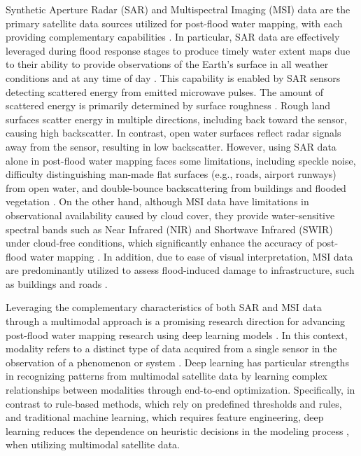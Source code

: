 \documentclass[preprint,12pt,authoryear]{elsarticle}
\begin{document}
Synthetic Aperture Radar (SAR) and Multispectral Imaging (MSI) data are the primary satellite data sources utilized for post-flood water mapping, with each providing complementary capabilities \citep{konapala2021exploring}. In particular, SAR data are effectively leveraged during flood response stages to produce timely water extent maps due to their ability to provide observations of the Earth's surface in all weather conditions and at any time of day \citep{ajmar2017response, boccardo2015remote, chaouch2012synergetic, uddin2019operational}. This capability is enabled by SAR sensors detecting scattered energy from emitted microwave pulses. The amount of scattered energy is primarily determined by surface roughness \citep{grimaldi2020flood}. Rough land surfaces scatter energy in multiple directions, including back toward the sensor, causing high backscatter. In contrast, open water surfaces reflect radar signals away from the sensor, resulting in low backscatter. However, using SAR data alone in post-flood water mapping faces some limitations, including speckle noise, difficulty distinguishing man-made flat surfaces (e.g., roads, airport runways) from open water, and double-bounce backscattering from buildings and flooded vegetation \citep{amitrano2024flood, grimaldi2020flood}. On the other hand, although MSI data have limitations in observational availability caused by cloud cover, they provide water-sensitive spectral bands such as Near Infrared (NIR) and Shortwave Infrared (SWIR) under cloud-free conditions, which significantly enhance the accuracy of post-flood water mapping \citep{konapala2021exploring}. In addition, due to ease of visual interpretation, MSI data are predominantly utilized to assess flood-induced damage to infrastructure, such as buildings and roads \citep{ajmar2017response, boccardo2015remote}.

Leveraging the complementary characteristics of both SAR and MSI data through a multimodal approach is a promising research direction for advancing post-flood water mapping research using deep learning models \citep{bentivoglio2022deep, li2024geoai, rolf2024mission}. In this context, modality refers to a distinct type of data acquired from a single sensor in the observation of a phenomenon or system \citep{li2025multi, ramachandram2017deep}. Deep learning has particular strengths in recognizing patterns from multimodal satellite data by learning complex relationships between modalities through end-to-end optimization. Specifically, in contrast to rule-based methods, which rely on predefined thresholds and rules, and traditional machine learning, which requires feature engineering, deep learning reduces the dependence on heuristic decisions in the modeling process \citep{amitrano2024flood, li2022water, wieland2019modular}, when utilizing multimodal satellite data.
\end{document}
